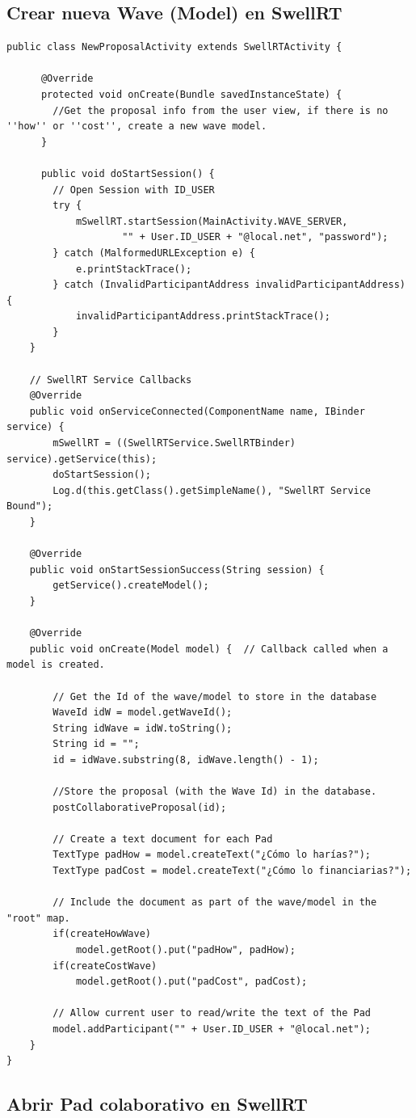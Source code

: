 \subsection{Crear nueva Wave (Model) en SwellRT} \label{ssec:waveCreateModel}

	  \begin{lstlisting}[frame=single]  
public class NewProposalActivity extends SwellRTActivity {
	  
	  @Override
	  protected void onCreate(Bundle savedInstanceState) {
	  	//Get the proposal info from the user view, if there is no ''how'' or ''cost'', create a new wave model.
	  }
	  
	  public void doStartSession() {
        // Open Session with ID_USER
        try {
            mSwellRT.startSession(MainActivity.WAVE_SERVER,
                    "" + User.ID_USER + "@local.net", "password");
        } catch (MalformedURLException e) {
            e.printStackTrace();
        } catch (InvalidParticipantAddress invalidParticipantAddress) {
            invalidParticipantAddress.printStackTrace();
        }
    }

    // SwellRT Service Callbacks
    @Override
    public void onServiceConnected(ComponentName name, IBinder service) {
        mSwellRT = ((SwellRTService.SwellRTBinder) service).getService(this);
        doStartSession();
        Log.d(this.getClass().getSimpleName(), "SwellRT Service Bound");
    }
    
    @Override
    public void onStartSessionSuccess(String session) {		
		getService().createModel();
    }
   
    @Override
    public void onCreate(Model model) {  // Callback called when a model is created.
        
        // Get the Id of the wave/model to store in the database
        WaveId idW = model.getWaveId();
        String idWave = idW.toString();
        String id = "";
        id = idWave.substring(8, idWave.length() - 1);

        //Store the proposal (with the Wave Id) in the database.
        postCollaborativeProposal(id);

        // Create a text document for each Pad
        TextType padHow = model.createText("¿Cómo lo harías?");
        TextType padCost = model.createText("¿Cómo lo financiarias?");

        // Include the document as part of the wave/model in the "root" map.
        if(createHowWave)
            model.getRoot().put("padHow", padHow);
        if(createCostWave)
            model.getRoot().put("padCost", padCost);

        // Allow current user to read/write the text of the Pad
        model.addParticipant("" + User.ID_USER + "@local.net");
    }  	
}	  
	  \end{lstlisting}
	  
\subsection{Abrir Pad colaborativo en SwellRT} \label{ssec:waveOpenPad}
	  
	  


\rhead{}
\renewcommand{\headrulewidth}{0pt}